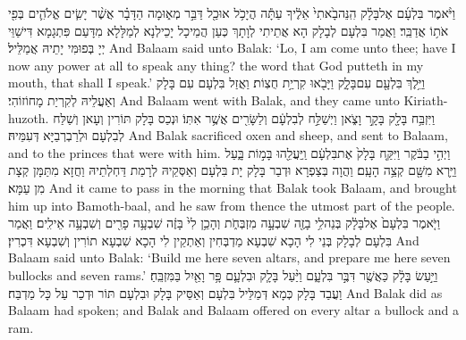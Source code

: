 {וַיֹּ֨אמֶר בִּלְעָ֜ם אֶל\maqqaf בָּלָ֗ק הִֽנֵּה\maqqaf בָ֙אתִי֙ אֵלֶ֔יךָ עַתָּ֕ה הֲיָכֹ֥ל אוּכַ֖ל דַּבֵּ֣ר מְא֑וּמָה הַדָּבָ֗ר אֲשֶׁ֨ר יָשִׂ֧ים אֱלֹהִ֛ים בְּפִ֖י אֹת֥וֹ אֲדַבֵּֽר׃}
{וַאֲמַר בִּלְעָם לְבָלָק הָא אֲתֵיתִי לְוָתָךְ כְּעַן הֲמֵיכָל יָכֵילְנָא לְמַלָּלָא מִדָּעַם פִּתְגָמָא דִּישַׁוֵּי יְיָ בְּפוּמִּי יָתֵיהּ אֲמַלֵּיל׃}
{And Balaam said unto Balak: ‘Lo, I am come unto thee; have I now any power at all to speak any thing? the word that God putteth in my mouth, that shall I speak.’}{}
{וַיֵּ֥לֶךְ בִּלְעָ֖ם עִם\maqqaf בָּלָ֑ק וַיָּבֹ֖אוּ קִרְיַ֥ת חֻצֽוֹת׃}
{וַאֲזַל בִּלְעָם עִם בָּלָק וְאַעֲלֵיהּ לְקִרְיַת מָחוֹזוֹהִי׃}
{And Balaam went with Balak, and they came unto Kiriath-huzoth.}{}
{וַיִּזְבַּ֥ח בָּלָ֖ק בָּקָ֣ר וָצֹ֑אן וַיְשַׁלַּ֣ח לְבִלְעָ֔ם וְלַשָּׂרִ֖ים אֲשֶׁ֥ר אִתּֽוֹ׃}
{וּנְכַס בָּלָק תּוֹרִין וְעָאן וְשַׁלַּח לְבִלְעָם וּלְרַבְרְבַיָּא דְּעִמֵּיהּ׃}
{And Balak sacrificed oxen and sheep, and sent to Balaam, and to the princes that were with him.}{}
{וַיְהִ֣י בַבֹּ֔קֶר וַיִּקַּ֤ח בָּלָק֙ אֶת\maqqaf בִּלְעָ֔ם וַֽיַּעֲלֵ֖הוּ בָּמ֣וֹת בָּ֑עַל וַיַּ֥רְא מִשָּׁ֖ם קְצֵ֥ה הָעָֽם׃}
{וַהֲוָה בְּצַפְרָא וּדְבַר בָּלָק יָת בִּלְעָם וְאַסְּקֵיהּ לְרָמַת דַּחְלְתֵיהּ וַחֲזָא מִתַּמָּן קְצָת מִן עַמָּא׃}
{And it came to pass in the morning that Balak took Balaam, and brought him up into Bamoth-baal, and he saw from thence the utmost part of the people.}{}
\newperek
{}%
{וַיֹּ֤אמֶר בִּלְעָם֙ אֶל\maqqaf בָּלָ֔ק בְּנֵה\maqqaf לִ֥י בָזֶ֖ה שִׁבְעָ֣ה מִזְבְּחֹ֑ת וְהָכֵ֥ן לִי֙ בָּזֶ֔ה שִׁבְעָ֥ה פָרִ֖ים וְשִׁבְעָ֥ה אֵילִֽים׃}
{וַאֲמַר בִּלְעָם לְבָלָק בְּנֵי לִי הָכָא שִׁבְעָא מַדְבְּחִין וְאַתְקֵין לִי הָכָא שִׁבְעָא תוֹרִין וְשִׁבְעָא דִּכְרִין׃}
{And Balaam said unto Balak: ‘Build me here seven altars, and prepare me here seven bullocks and seven rams.’}{}
{וַיַּ֣עַשׂ בָּלָ֔ק כַּאֲשֶׁ֖ר דִּבֶּ֣ר בִּלְעָ֑ם וַיַּ֨עַל בָּלָ֧ק וּבִלְעָ֛ם פָּ֥ר וָאַ֖יִל בַּמִּזְבֵּֽחַ׃}
{וַעֲבַד בָּלָק כְּמָא דְּמַלֵּיל בִּלְעָם וְאַסֵּיק בָּלָק וּבִלְעָם תּוֹר וּדְכַר עַל כָּל מַדְבַּח׃}
{And Balak did as Balaam had spoken; and Balak and Balaam offered on every altar a bullock and a ram.}{}
